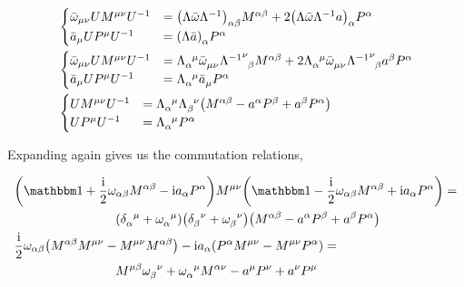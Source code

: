 \begin{align}
    &\begin{cases}
        {\bar\omega}_{\mu\nu}UM^{\mu\nu}U^{-1}&=\qty(\Lambda\bar\omega\Lambda^{-1})_{\alpha\beta}M^{\alpha\beta}+2\qty(\Lambda \bar \omega\Lambda^{-1} a)_\alpha P^\alpha \\
        {\bar a}_\mu UP^\mu U^{-1}&=\qty(\Lambda \bar a )_\alpha P^\alpha
    \end{cases}\nonumber\\
    &\begin{cases}
        {\bar\omega}_{\mu\nu}UM^{\mu\nu}U^{-1}&=\tensor{\Lambda}{_\alpha^\mu}\tensor{{\bar\omega}}{_\mu_\nu}\tensor{{\Lambda^{-1}}}{^\nu_\beta}M^{\alpha\beta} +2\tensor{\Lambda}{_\alpha^\mu}\tensor{{\bar \omega}}{_\mu_\nu}\tensor{{\Lambda^{-1}}}{^\nu_\beta} a^\beta P^\alpha \\
        {\bar a}_\mu UP^\mu U^{-1}&=\tensor{\Lambda}{_\alpha^\mu}\tensor{{\bar a}}{_\mu} P^\alpha 
    \end{cases}\nonumber\\
    &\begin{cases}
        UM^{\mu\nu}U^{-1}&=\tensor{\Lambda}{_\alpha^\mu}\tensor{\Lambda}{_\beta^\nu}\qty(M^{\alpha\beta} -a^\alpha P^\beta +a^\beta P^\alpha) \\
        UP^\mu U^{-1}&=\tensor{\Lambda}{_\alpha^\mu} P^\alpha 
    \end{cases}\nonumber
\end{align}

Expanding again gives us the commutation relations,

\begin{align}
    &\qty(\mathbbm 1 +\frac\im 2\omega_{\alpha\beta}M^{\alpha\beta}-\im a_\alpha P^\alpha)M^{\mu\nu}\qty(\mathbbm 1 -\frac\im 2\omega_{\alpha\beta}M^{\alpha\beta}+\im a_\alpha P^\alpha)=\nonumber\\&\quad\quad\quad\quad\quad\quad\quad\quad\qty(\tensor{\delta}{_\alpha^\mu}+\tensor{\omega}{_\alpha^\mu})\qty(\tensor{\delta}{_\beta^\nu}+\tensor{\omega}{_\beta^\nu})\qty(M^{\alpha\beta}-a^\alpha P^\beta+a^\beta P^\alpha)\nonumber\\
    &\frac\im 2\omega_{\alpha\beta}\qty(M^{\alpha\beta}M^{\mu\nu}-M^{\mu\nu}M^{\alpha\beta})-\im a_\alpha\qty( P^\alpha M^{\mu\nu}-M^{\mu\nu} P^\alpha)=\nonumber\\&\quad\quad\quad\quad\quad\quad\quad\quad M^{\mu\beta}\tensor{\omega}{_\beta^\nu}+\tensor{\omega}{_\alpha^\mu}M^{\alpha\nu}-a^\mu P^\nu+a^\nu P^\mu\nonumber
\end{align}

